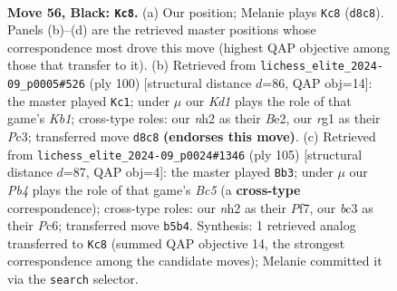 \documentclass[11pt]{article}
\begin{document}
\begin{figure}[p]\centering
\begin{subfigure}{0.46\textwidth}\centering
\resizebox{\linewidth}{!}{%
\newchessgame
\chessboard[
  setfen={1r1k1b2/6p1/p1p4r/Pp1b1p1p/2p2P1P/2B1P1P1/1P1K3N/1R4R1 b - - 14 56},
  showmover=false,
  pgfstyle=straightmove, color=movearrow, markmove={d8-c8}
]}
\caption{}
\end{subfigure}\hfill
\begin{subfigure}{0.46\textwidth}\centering
\resizebox{\linewidth}{!}{%
\newchessgame
\chessboard[
  setfen={4r2r/5p2/1kb1p1p1/1p1pP2p/pP3P2/P1PR2P1/4B2P/1K1R4 w - - 41 51},
  showmover=false,
  pgfstyle=straightmove, color=movearrow, markmove={b1-c1}
]}
\caption{}
\end{subfigure}
\\[4pt]
\begin{subfigure}{0.46\textwidth}\centering
\resizebox{\linewidth}{!}{%
\newchessgame
\chessboard[
  setfen={2k5/2p2p2/2pr2p1/p5Pp/P1bBP2P/2P2PK1/3r4/R6R b - - 56 53},
  showmover=false,
  pgfstyle=straightmove, color=movearrow, markmove={c4-b3}
]}
\caption{}
\end{subfigure}\hfill

\caption{\textbf{Move 56, Black: \texttt{Kc8}.} (a) Our position; Melanie plays \texttt{Kc8} (\texttt{d8c8}). Panels (b)--(d) are the retrieved master positions whose correspondence most drove this move (highest QAP objective among those that transfer to it). (b) Retrieved from \texttt{lichess\_elite\_2024-09\_p0005\#526} (ply 100) [structural distance $d$=86, QAP obj=14]: the master played \texttt{Kc1}; under $\mu$ our \emph{Kd1} plays the role of that game's \emph{Kb1}; cross-type roles: our \emph{n}h2 as their \emph{B}e2, our \emph{r}g1 as their \emph{P}c3; transferred move \texttt{d8c8} \textbf{(endorses this move)}. (c) Retrieved from \texttt{lichess\_elite\_2024-09\_p0024\#1346} (ply 105) [structural distance $d$=87, QAP obj=4]: the master played \texttt{Bb3}; under $\mu$ our \emph{Pb4} plays the role of that game's \emph{Bc5} (a \textbf{cross-type} correspondence); cross-type roles: our \emph{n}h2 as their \emph{P}f7, our \emph{b}c3 as their \emph{P}c6; transferred move \texttt{b5b4}. Synthesis: 1 retrieved analog transferred to \texttt{Kc8} (summed QAP objective 14, the strongest correspondence among the candidate moves); Melanie committed it via the \texttt{search} selector.}
\label{fig:thought-m111}
\end{figure}

\clearpage
\end{document}
